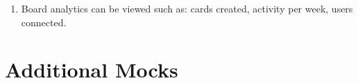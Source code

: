 \documentclass{article}
\begin{document}
\begin{enumerate}
			\begin{enumerate}
				\item Board analytics can be viewed such as: cards created, activity per week, users connected.
			\end{enumerate}
		\begin{center}
		\end{center}
	\end{enumerate}


	\section{Additional Mocks}

	\vspace{0.5cm}

	\begin{center}
	\end{center}


\end{document}

